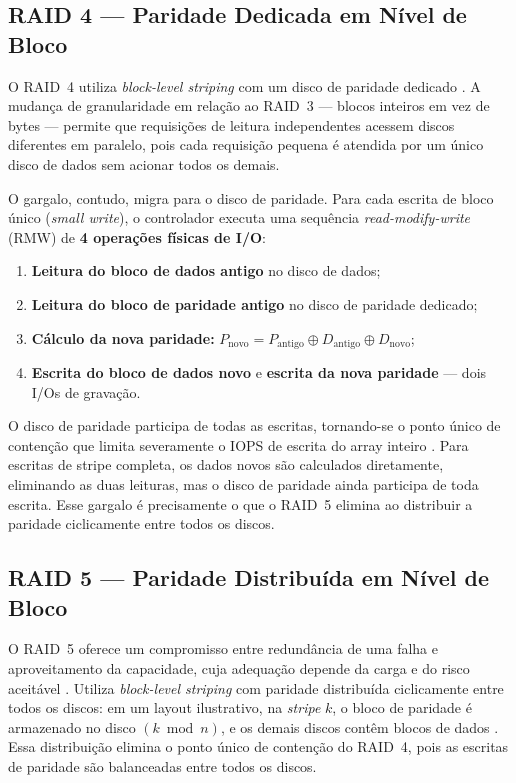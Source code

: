 \documentclass[titlepage]{article}
\begin{document}
\subsection{RAID 4 --- Paridade Dedicada em Nível de Bloco}
O RAID~4 utiliza \textit{block-level striping} com um disco de paridade dedicado \cite{silberschatz2020}. A mudança de granularidade em relação ao RAID~3 --- blocos inteiros em vez de bytes --- permite que requisições de leitura independentes acessem discos diferentes em paralelo, pois cada requisição pequena é atendida por um único disco de dados sem acionar todos os demais.

O gargalo, contudo, migra para o disco de paridade. Para cada escrita de bloco único (\textit{small write}), o controlador executa uma sequência \textit{read-modify-write} (RMW) de \textbf{4 operações físicas de I/O}:
\begin{enumerate}
    \item \textbf{Leitura do bloco de dados antigo} no disco de dados;
    \item \textbf{Leitura do bloco de paridade antigo} no disco de paridade dedicado;
    \item \textbf{Cálculo da nova paridade:} $P_{\mathrm{novo}} = P_{\mathrm{antigo}} \oplus D_{\mathrm{antigo}} \oplus D_{\mathrm{novo}}$;
    \item \textbf{Escrita do bloco de dados novo} e \textbf{escrita da nova paridade} --- dois I/Os de gravação.
\end{enumerate}
O disco de paridade participa de todas as escritas, tornando-se o ponto único de contenção que limita severamente o IOPS de escrita do array inteiro \cite{silberschatz2020}. Para escritas de stripe completa, os dados novos são calculados diretamente, eliminando as duas leituras, mas o disco de paridade ainda participa de toda escrita. Esse gargalo é precisamente o que o RAID~5 elimina ao distribuir a paridade ciclicamente entre todos os discos.

\subsection{RAID 5 --- Paridade Distribuída em Nível de Bloco}
O RAID~5 oferece um compromisso entre redundância de uma falha e aproveitamento da capacidade, cuja adequação depende da carga e do risco aceitável \cite{silberschatz2020}. Utiliza \textit{block-level striping} com paridade distribuída ciclicamente entre todos os discos: em um layout ilustrativo, na \textit{stripe} $k$, o bloco de paridade é armazenado no disco $(k \bmod n)$, e os demais discos contêm blocos de dados \cite{silberschatz2020}. Essa distribuição elimina o ponto único de contenção do RAID~4, pois as escritas de paridade são balanceadas entre todos os discos.
\end{document}
